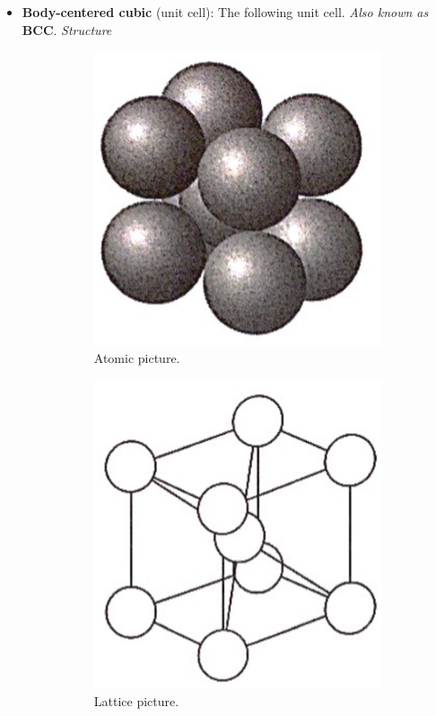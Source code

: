 \documentclass[../notes.tex]{subfiles}
\begin{document}
\begin{itemize}
    \item \textbf{Body-centered cubic} (unit cell): The following unit cell. \emph{Also known as} \textbf{BCC}. \emph{Structure}
    \begin{figure}[h!]
        \centering
        \begin{subfigure}[b]{0.2\linewidth}
            \centering
            \includegraphics[width=0.6\linewidth]{../ExtFiles/BCCunitCella.png}
            \caption{Atomic picture.}
            \label{fig:BCCunitCella}
        \end{subfigure}
        \begin{subfigure}[b]{0.2\linewidth}
            \centering
            \includegraphics[width=0.65\linewidth]{../ExtFiles/BCCunitCellb.png}
            \caption{Lattice picture.}
            \label{fig:BCCunitCellb}
        \end{subfigure}
        \begin{subfigure}[b]{0.2\linewidth}

\end{subfigure}
\end{figure}
\end{itemize}
\end{document}
